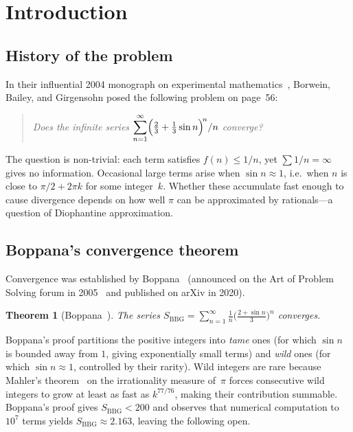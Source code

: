 \documentclass[12pt]{amsart}
\newtheorem{theorem}{Theorem}[section]
\begin{document}
\maketitle
\tableofcontents

\section{Introduction}

\subsection{History of the problem}

In their influential 2004 monograph on experimental
mathematics~\cite{BBG2004}, Borwein, Bailey, and Girgensohn posed the
following problem on page~56:
\begin{quote}
  \emph{Does the infinite series
  $\displaystyle\sum_{n=1}^{\infty}
  \Bigl(\tfrac{2}{3}+\tfrac{1}{3}\sin n\Bigr)^{\!n}/n$
  converge?}
\end{quote}
The question is non-trivial: each term satisfies
$f(n)\le 1/n$, yet $\sum 1/n=\infty$ gives no information.
Occasional large terms arise when $\sin n\approx 1$, i.e.\ when $n$
is close to $\pi/2+2\pi k$ for some integer~$k$.  Whether these
accumulate fast enough to cause divergence depends on how well $\pi$
can be approximated by rationals---a question of Diophantine
approximation.

\subsection{Boppana's convergence theorem}

Convergence was established by Boppana~\cite{Boppana2020} (announced
on the Art of Problem Solving forum in 2005~\cite{Boppana2005} and
published on arXiv in 2020).

\begin{theorem}[Boppana~\cite{Boppana2020}]\label{thm:boppana}
The series
$S_{\mathrm{BBG}}=\sum_{n=1}^{\infty}\tfrac{1}{n}
\bigl(\tfrac{2+\sin n}{3}\bigr)^{\!n}$
converges.
\end{theorem}

Boppana's proof partitions the positive integers into \emph{tame}
ones (for which $\sin n$ is bounded away from $1$, giving
exponentially small terms) and \emph{wild} ones (for which
$\sin n\approx 1$, controlled by their rarity).  Wild integers are
rare because Mahler's theorem~\cite{Mahler1953} on the irrationality
measure of~$\pi$ forces consecutive wild integers to grow at least
as fast as $k^{77/76}$, making their contribution summable.
Boppana's proof gives $S_{\mathrm{BBG}}<200$ and observes that
numerical computation to $10^7$ terms yields
$S_{\mathrm{BBG}}\approx 2.163$, leaving the following open.
\end{document}
